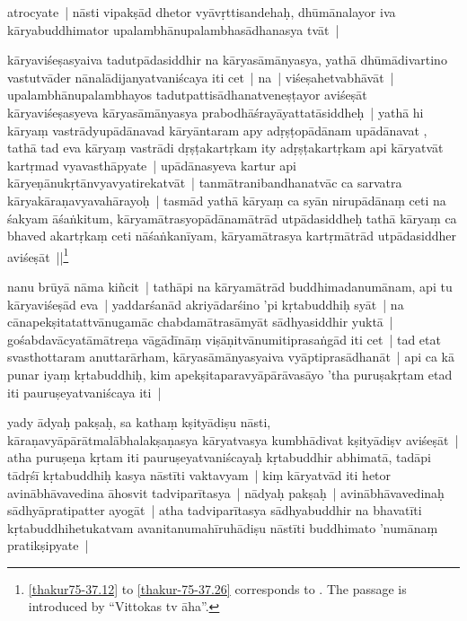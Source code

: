 \documentclass[article,12pt,a4paper]{memoir}
\newcommand{\gap}[1]{}
\begin{document}
	  \pstart atrocyate | nāsti vipakṣād dhetor vyāvṛttisandehaḥ, dhūmānalayor iva kāryabuddhimator upalambhānupalambhasādhanasya tvāt |
	\pend
      

	  \pstart kāryaviśeṣasyaiva tadutpādasiddhir na kā\gap{}ryasāmānyasya, yathā dhūmādivartino vastutvāder nānalādijanyatvaniścaya iti cet | na | viśeṣahetvabhāvāt | upalambhānupalambhayos tadutpattisādhanatveneṣṭayor aviśeṣāt kāryaviśeṣasyeva kāryasāmānyasya prabodhāśrayāyattatāsiddheḥ |\label{rnā__97385} yathā hi kāryaṃ vastrādyupādānavad  kāryāntaram apy adṛṣṭopādānam upādānavat , tathā tad eva kāryaṃ vastrādi dṛṣṭakartṛkam ity adṛṣṭakartṛkam api kāryatvāt kartṛmad vyavasthāpyate | upādānasyeva kartur api kāryeṇānukṛtānvyavyatirekatvāt | tanmātranibandhanatvāc ca sarvatra kāryakāraṇavyavahārayoḥ | tasmād yathā kārya\leavevmode{}\label{RNAms_21b}ṃ ca syān nirupādānaṃ ceti na śakyam āśaṅkitum, kāryamātrasyopādānamātrād utpādasiddheḥ tathā kāryaṃ ca bhaved akartṛkaṃ ceti nāśaṅkanīyam, kāryamātrasya kartṛmātrād utpādasiddher aviśeṣāt ||\label{thakur-75-37.26}\footnote{\cref{thakur75-37.12} to \cref{thakur-75-37.26} corresponds to . The passage is introduced by “Vittokas tv āha”.}
	\pend
      

	  \pstart nanu brūyā nāma kiñcit | tathāpi na kāryamātrād buddhimadanumānam, api tu kāryaviśeṣād eva | yaddarśanād akriyādarśino 'pi kṛtabuddhiḥ syāt | na cānapekṣitatattvānugamāc chabdamātrasāmyāt sādhyasiddhir yuktā | gośabdavācyatāmātreṇa vāgādīnāṃ viṣāṇitvānumitiprasaṅgād iti cet | tad etat svasthottaram anuttarārham, kāryasāmānyasyaiva vyāptiprasādhanāt | api ca kā punar iyaṃ kṛtabuddhiḥ, kim apekṣitaparavyāpārāvasāyo 'tha puruṣakṛtam etad iti pauruṣeyatvaniścaya iti |
	\pend
      

	  \pstart yady ādyaḥ pakṣaḥ, sa kathaṃ kṣityādiṣu nāsti, kāraṇavyāpārātmalābhalakṣaṇasya kāryatvasya kumbhādivat kṣityādiṣv aviśeṣāt | atha puruṣeṇa kṛtam iti pauruṣeyatvaniścayaḥ kṛtabuddhir abhimatā, tadāpi tādṛśī kṛtabuddhiḥ kasya nāstīti vaktavyam | kiṃ kāryatvād iti hetor avinābhāvavedina āhosvit tadviparītasya | nādyaḥ pakṣaḥ | avinābhāvavedinaḥ sādhyāpratipatter ayogāt | atha tadviparītasya sādhyabuddhir na bhavatīti kṛtabuddhihetukatvam avanitanumahīruhādiṣu nāstīti buddhimato 'numānaṃ pratikṣipyate |
	\pend
      
\end{document}
